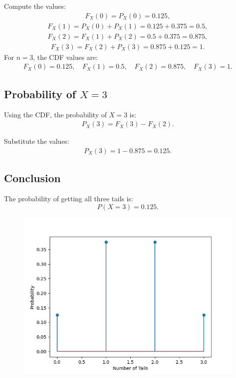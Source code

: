 \documentclass[journal]{IEEEtran}
\begin{document}
Compute the values:
\begin{align}
F_X(0) = P_X(0) = 0.125,
\end{align}
\begin{align}
F_X(1) = P_X(0) + P_X(1) = 0.125 + 0.375 = 0.5,
\end{align}
\begin{align}
F_X(2) = F_X(1) + P_X(2) = 0.5 + 0.375 = 0.875,
\end{align}
\begin{align}
F_X(3) = F_X(2) + P_X(3) = 0.875 + 0.125 = 1.
\end{align}
For \(n = 3\), the CDF values are:
\begin{align}
F_X(0) = 0.125, \quad F_X(1) = 0.5, \quad F_X(2) = 0.875, \quad F_X(3) = 1.
\end{align}


\subsection*{Probability of \(X = 3\)}
Using the CDF, the probability of \(X = 3\) is:
\begin{align}
P_X(3) = F_X(3) - F_X(2).
\end{align}

Substitute the values:
\begin{align}
P_X(3) = 1 - 0.875 = 0.125.
\end{align}
\subsection*{Conclusion}
The probability of getting all three tails is:
\[
P(X = 3) = \boxed{0.125}.
\]
	\begin{figure}[h!]
		\centering
		\includegraphics[width=\columnwidth]{figs/fig1.png}
		\label{stemplot}
	\end{figure}
	
\end{document}
